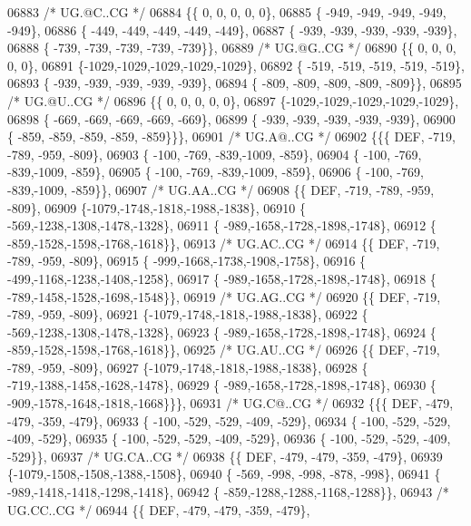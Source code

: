 \begin{DoxyCode}
06883 \textcolor{comment}{/* UG.@C..CG */}
06884 \{\{    0,    0,    0,    0,    0\},
06885 \{ -949, -949, -949, -949, -949\},
06886 \{ -449, -449, -449, -449, -449\},
06887 \{ -939, -939, -939, -939, -939\},
06888 \{ -739, -739, -739, -739, -739\}\},
06889 \textcolor{comment}{/* UG.@G..CG */}
06890 \{\{    0,    0,    0,    0,    0\},
06891 \{-1029,-1029,-1029,-1029,-1029\},
06892 \{ -519, -519, -519, -519, -519\},
06893 \{ -939, -939, -939, -939, -939\},
06894 \{ -809, -809, -809, -809, -809\}\},
06895 \textcolor{comment}{/* UG.@U..CG */}
06896 \{\{    0,    0,    0,    0,    0\},
06897 \{-1029,-1029,-1029,-1029,-1029\},
06898 \{ -669, -669, -669, -669, -669\},
06899 \{ -939, -939, -939, -939, -939\},
06900 \{ -859, -859, -859, -859, -859\}\}\},
06901 \textcolor{comment}{/* UG.A@..CG */}
06902 \{\{\{  DEF, -719, -789, -959, -809\},
06903 \{ -100, -769, -839,-1009, -859\},
06904 \{ -100, -769, -839,-1009, -859\},
06905 \{ -100, -769, -839,-1009, -859\},
06906 \{ -100, -769, -839,-1009, -859\}\},
06907 \textcolor{comment}{/* UG.AA..CG */}
06908 \{\{  DEF, -719, -789, -959, -809\},
06909 \{-1079,-1748,-1818,-1988,-1838\},
06910 \{ -569,-1238,-1308,-1478,-1328\},
06911 \{ -989,-1658,-1728,-1898,-1748\},
06912 \{ -859,-1528,-1598,-1768,-1618\}\},
06913 \textcolor{comment}{/* UG.AC..CG */}
06914 \{\{  DEF, -719, -789, -959, -809\},
06915 \{ -999,-1668,-1738,-1908,-1758\},
06916 \{ -499,-1168,-1238,-1408,-1258\},
06917 \{ -989,-1658,-1728,-1898,-1748\},
06918 \{ -789,-1458,-1528,-1698,-1548\}\},
06919 \textcolor{comment}{/* UG.AG..CG */}
06920 \{\{  DEF, -719, -789, -959, -809\},
06921 \{-1079,-1748,-1818,-1988,-1838\},
06922 \{ -569,-1238,-1308,-1478,-1328\},
06923 \{ -989,-1658,-1728,-1898,-1748\},
06924 \{ -859,-1528,-1598,-1768,-1618\}\},
06925 \textcolor{comment}{/* UG.AU..CG */}
06926 \{\{  DEF, -719, -789, -959, -809\},
06927 \{-1079,-1748,-1818,-1988,-1838\},
06928 \{ -719,-1388,-1458,-1628,-1478\},
06929 \{ -989,-1658,-1728,-1898,-1748\},
06930 \{ -909,-1578,-1648,-1818,-1668\}\}\},
06931 \textcolor{comment}{/* UG.C@..CG */}
06932 \{\{\{  DEF, -479, -479, -359, -479\},
06933 \{ -100, -529, -529, -409, -529\},
06934 \{ -100, -529, -529, -409, -529\},
06935 \{ -100, -529, -529, -409, -529\},
06936 \{ -100, -529, -529, -409, -529\}\},
06937 \textcolor{comment}{/* UG.CA..CG */}
06938 \{\{  DEF, -479, -479, -359, -479\},
06939 \{-1079,-1508,-1508,-1388,-1508\},
06940 \{ -569, -998, -998, -878, -998\},
06941 \{ -989,-1418,-1418,-1298,-1418\},
06942 \{ -859,-1288,-1288,-1168,-1288\}\},
06943 \textcolor{comment}{/* UG.CC..CG */}
06944 \{\{  DEF, -479, -479, -359, -479\},

\end{DoxyCode}
